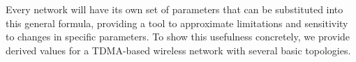 Every network will have its own set of parameters that can be substituted into this general formula, providing a tool to approximate limitations and sensitivity to changes in specific parameters.  To show this usefulness concretely, we provide derived values for a TDMA-based wireless network with several basic topologies.



